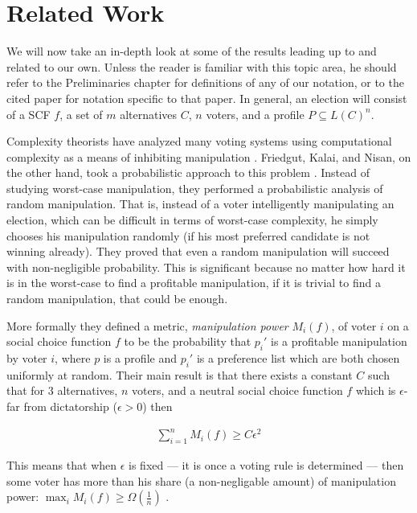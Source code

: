 
\chapter{Related Work}

	We will now take an in-depth look at some of the results leading up to and related to our own. Unless the reader is familiar with this topic area, he should refer to the Preliminaries chapter for definitions of any of our notation, or to the cited paper for notation specific to that paper. In general, an election will consist of a SCF $f$, a set of $m$ alternatives $C$, $n$ voters, and a profile $P \subseteq L(C)^n$.

	Complexity theorists have analyzed many voting systems using computational complexity as a means of inhibiting manipulation \cite{bartholdi1989computational, hemaspaandra2009hybrid}. Friedgut, Kalai, and Nisan, on the other hand, took a probabilistic approach to this problem \cite{friedgut2008elections}. Instead of studying worst-case manipulation, they performed a probabilistic analysis of random manipulation. That is, instead of a voter intelligently manipulating an election, which can be difficult in terms of worst-case complexity, he simply chooses his manipulation randomly (if his most preferred candidate is not winning already). They proved that even a random manipulation will succeed with non-negligible probability. This is significant because no matter how hard it is in the worst-case to find a profitable manipulation, if it is trivial to find a random manipulation, that could be enough.

	More formally they defined a metric, \emph{manipulation power} $M_i(f)$, of voter $i$ on a social choice function $f$ to be the probability that $p_i'$ is a profitable manipulation by voter $i$, where $p$ is a profile and $p_i'$ is a preference list which are both chosen uniformly at random. Their main result is that there exists a constant $C$ such that for 3 alternatives, $n$ voters, and a neutral social choice function $f$ which is $\epsilon$-far from dictatorship ($\epsilon > 0$) then

	\begin{align*}
		\sum_{i=1}^n M_i(f) \ge C \epsilon^2
	\end{align*}

	This means that when $\epsilon$ is fixed --- it is once a voting rule is determined --- then some voter has more than his share (a non-negligable amount) of manipulation power: $\max_i M_i(f) \ge \Omega(\frac{1}{n})$ \cite{friedgut2008elections}.

